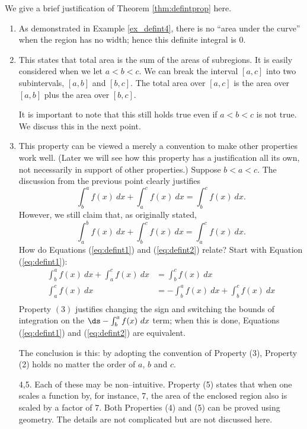 We give a brief justification of Theorem \ref{thm:defintprop} here.
		\begin{enumerate}
		\item		As demonstrated in Example \ref{ex_defint4}, there is no ``area under the curve'' when the region has no width; hence this definite integral is 0.
		\item		This states that total area is the sum of the areas of subregions. It is easily considered when we let $a<b<c$. We can break the interval $[a,c]$ into two subintervals, $[a,b]$ and $[b,c]$. The total area over $[a,c]$ is the area over $[a,b]$ plus the area over $[b,c]$. 
		
		It is important to note that this still holds true even if $a<b<c$ is not true. We discuss this in the next point.
		\item		This property can be viewed a merely a convention to make other properties work well. (Later we will see how this property has a justification all its own, not necessarily in support of other properties.) Suppose $b<a<c$. The discussion from the previous point clearly justifies 
		\begin{equation}\int_b^a f(x)\ dx + \int_a^c f(x)\ dx = \int_b^c f(x)\ dx.\label{eq:defint1}\end{equation}
		However, we still claim that, as originally stated, 
		\begin{equation}\int_a^b f(x)\ dx + \int_b^c f(x)\ dx = \int_a^c f(x)\ dx.\label{eq:defint2}\end{equation}
		How do Equations (\ref{eq:defint1}) and (\ref{eq:defint2}) relate? Start with Equation (\ref{eq:defint1}):
		\begin{align*}
		\int_b^a f(x)\ dx + \int_a^c f(x)\ dx &= \int_b^c f(x)\ dx\\
		\int_a^c f(x)\ dx &= -\int_b^a f(x)\ dx + \int_b^c f(x)\ dx\\
		\end{align*}
Property $(3)$ justifies changing the sign and switching the bounds of integration on the $\ds -\int_b^a f(x)\ dx$ term; when this is done, Equations (\ref{eq:defint1}) and (\ref{eq:defint2}) are equivalent.

The conclusion is this: by adopting the convention of Property (3), Property (2) holds no matter the order of $a$, $b$ and $c$.
	\item[4,5.]	Each of these may be non--intuitive. Property (5) states that when one scales a function by, for instance, 7, the area of the enclosed region also is scaled by a factor of 7. Both Properties (4) and (5)  can be proved using geometry. The details are not complicated but are not discussed here.
\end{enumerate}

